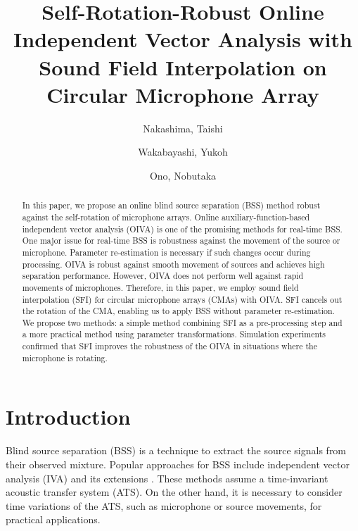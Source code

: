 \documentclass[sip,biber]{now-journal}
\title{Self-Rotation-Robust Online Independent Vector Analysis with\\Sound Field Interpolation on Circular Microphone Array}
\author{Nakashima, Taishi}
\affil{Tokyo Metropolitan University, Tokyo, Japan}
\author{Wakabayashi, Yukoh}
\affil{Toyohashi University of Technology, Aichi, Japan}
\author[1]{Ono, Nobutaka}
\begin{document}
\begin{abstract}
  In this paper, we propose an online blind source separation (BSS) method robust against the self-rotation of microphone arrays.
  Online auxiliary-function-based independent vector analysis (OIVA) is one of the promising methods for real-time BSS.
  One major issue for real-time BSS is robustness against the movement of the source or microphone.
  Parameter re-estimation is necessary if such changes occur during processing.
  OIVA is robust against smooth movement of sources and achieves high separation performance.
  However, OIVA does not perform well against rapid movements of microphones.
  Therefore, in this paper, we employ sound field interpolation (SFI) for circular microphone arrays (CMAs) with OIVA.
  SFI cancels out the rotation of the CMA, enabling us to apply BSS without parameter re-estimation.
  We propose two methods: a simple method combining SFI as a pre-processing step and a more practical method using parameter transformations.
  Simulation experiments confirmed that SFI improves the robustness of the OIVA in situations where the microphone is rotating.
\end{abstract}

\section{Introduction}\label{sec:intro}
Blind source separation (BSS) \cite{Makino:2018:ASS} is a technique to extract the source signals from their observed mixture.
Popular approaches for BSS include independent vector analysis (IVA) \cite{Kim:2006:ASLP,Hiroe:2006:ICA} and its extensions \cite{Kitamura:2016:ASLP,Nugraha:2020:SPL,Brendel:2020:SP}.
These methods assume a time-invariant acoustic transfer system (ATS).
On the other hand, it is necessary to consider time variations of the ATS, such as microphone or source movements, for practical applications.
\end{document}
